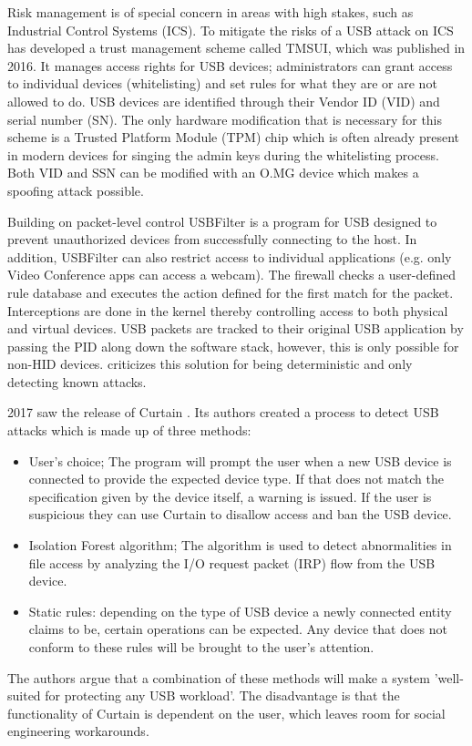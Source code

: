 Risk management is of special concern in areas with high stakes, such as Industrial Control Systems (ICS). To mitigate the risks of a USB attack on ICS \cite{yangTMSUITrustManagement2016} has developed a trust management scheme called TMSUI, which was published in 2016. It manages access rights for USB devices; administrators can grant access to individual devices (whitelisting) and set rules for what they are or are not allowed to do. USB devices are identified through their Vendor ID (VID) and serial number (SN). The only hardware modification that is necessary for this scheme is a Trusted Platform Module (TPM) chip which is often already present in modern devices for singing the admin keys during the whitelisting process. \\
Both VID and SSN can be modified with an O.MG device which makes a spoofing attack possible.

Building on packet-level control USBFilter \cite{tianMakingUSBGreat2016} is a program for USB designed to prevent unauthorized devices from successfully connecting to the host. In addition, USBFilter can also restrict access to individual applications (e.g. only Video Conference apps can access a webcam). The firewall checks a user-defined rule database and executes the action defined for the first match for the packet. Interceptions are done in the kernel thereby controlling access to both physical and virtual devices. USB packets are tracked to their original USB application by passing the PID along down the software stack, however, this is only possible for non-HID devices.
\cite{nissimUSBbasedAttacks2017} criticizes this solution for being deterministic and only detecting known attacks. 

2017 saw the release of Curtain \cite{fuCurtainKeepYour2017}. Its authors created a process to detect USB attacks which is made up of three methods:
\begin{itemize}
    \item User's choice; The program will prompt the user when a new USB device is connected to provide the expected device type. If that does not match the specification given by the device itself, a warning is issued. If the user is suspicious they can use Curtain to disallow access and ban the USB device.
    \item Isolation Forest algorithm; The algorithm is used to detect abnormalities in file access by analyzing the I/O request packet (IRP) flow from the USB device. 
    \item Static rules: depending on the type of USB device a newly connected entity claims to be, certain operations can be expected. Any device that does not conform to these rules will be brought to the user's attention. 
\end{itemize}
The authors argue that a combination of these methods will make a system 'well-suited for protecting any USB workload'.  The disadvantage is that the functionality of Curtain is dependent on the user, which leaves room for social engineering workarounds.  

